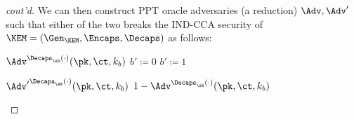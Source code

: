 \begin{answer}
\begin{proof}[cont'd]
        We can then construct PPT oracle adversaries (a reduction) $\Adv, \Adv'$ such that either of the two breaks the IND-CCA security of $\KEM= (\Gen_\KEM, \Encaps, \Decaps)$ as follows:
        \begin{simplebox}
            \small
            \noindent
            \begin{minipage}[t]{0.5\textwidth}
                \begin{algorithmic}[1]
                    \Statex \textbf{$\Adv^{\Decaps_\sk(\cdot)}(\pk, \ct, k_b)$}
                    \Indent
                        \State \Return $b'\coloneqq 0$
                    \Else
                        \State \Return $b'\coloneqq 1$
                    \EndIf
                    \EndIndent
                \end{algorithmic}
            \end{minipage}
            \hfill
            \begin{minipage}[t]{0.48\textwidth}
                \begin{algorithmic}[1]
                    \Statex \textbf{${\Adv'}^{\Decaps_\sk(\cdot)}(\pk, \ct, k_b)$}
                    \Indent
                    \State\Return $1- \Adv^{\Decaps_\sk(\cdot)}(\pk, \ct, k_b)$
                    \EndIndent
                \end{algorithmic}
            \end{minipage}
        \end{simplebox}


\end{proof}
\end{answer}
